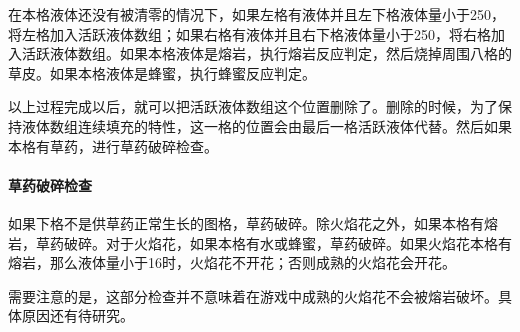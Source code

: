 在本格液体还没有被清零的情况下，如果左格有液体并且左下格液体量小于250，将左格加入活跃液体数组；如果右格有液体并且右下格液体量小于250，将右格加入活跃液体数组。如果本格液体是熔岩，执行熔岩反应判定，然后烧掉周围八格的草皮。如果本格液体是蜂蜜，执行蜂蜜反应判定。

以上过程完成以后，就可以把活跃液体数组这个位置删除了。删除的时候，为了保持液体数组连续填充的特性，这一格的位置会由最后一格活跃液体代替。然后如果本格有草药，进行草药破碎检查。

\paragraph*{草药破碎检查}
如果下格不是供草药正常生长的图格，草药破碎。除火焰花之外，如果本格有熔岩，草药破碎。对于火焰花，如果本格有水或蜂蜜，草药破碎。如果火焰花本格有熔岩，那么液体量小于16时，火焰花不开花；否则成熟的火焰花会开花。

需要注意的是，这部分检查并不意味着在游戏中成熟的火焰花不会被熔岩破坏。具体原因还有待研究。